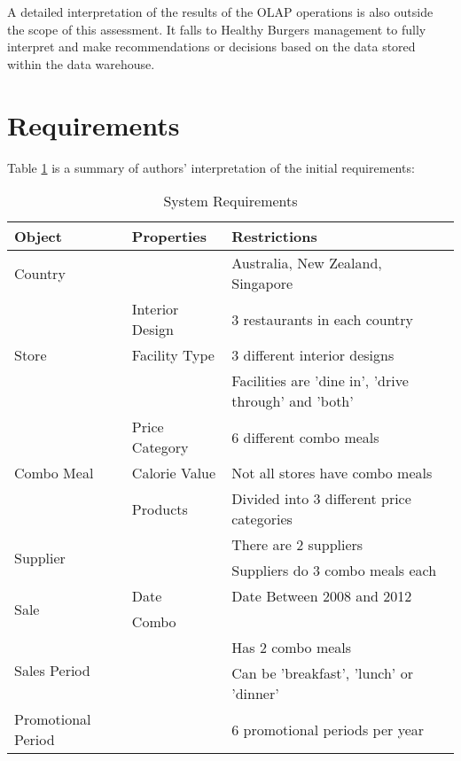 \documentclass[12pt, a4paper]{article}
\begin{document}
A detailed interpretation of the results of the OLAP operations is also outside the scope of this assessment. It falls to Healthy Burgers management to fully interpret and make recommendations or decisions based on the data stored within the data warehouse.

\section*{Requirements}

Table \ref{tab:requirements} is a summary of authors' interpretation of the initial requirements:

\begin{table}

\begin{tabular}{|l|l|l|}

\hline
\textbf{Object} & \textbf{Properties} & \textbf{Restrictions} \\
\hline

Country & & Australia, New Zealand, Singapore \\
\hline

\multirow{3}{3cm}{Store} & Interior Design  & 3 restaurants in each country \\
 	& Facility Type & 3 different interior designs \\
	& & Facilities are 'dine in', 'drive through' and 'both' \\
\hline

\multirow{3}{3cm}{Combo Meal} & Price Category & 6 different combo meals \\
	& Calorie Value & Not all stores have combo meals \\
	& Products & Divided into 3 different price categories \\ 

\hline

\multirow{2}{3cm}{Supplier} & & There are 2 suppliers \\ 
	& & Suppliers do 3 combo meals each\\
\hline

\multirow{2}{3cm}{Sale} & Date & Date Between 2008 and 2012 \\
	& Combo &  \\
\hline

\multirow{2}{3cm}{Sales Period} & & Has 2 combo meals \\ 
	& & Can be 'breakfast', 'lunch' or 'dinner' \\
\hline	

Promotional Period & & 6 promotional periods per year\\

\hline

\end{tabular}

\caption{System Requirements}
\label{tab:requirements}

\end{table}
\end{document}
